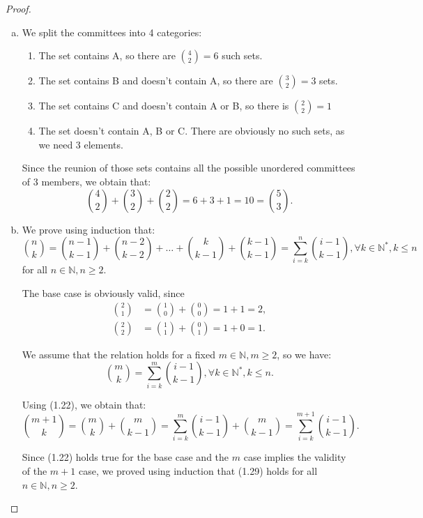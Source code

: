 \begin{proof}
    \hfill
    \begin{enumerate}[(a)]
        \item We split the committees into 4 categories:
            \begin{enumerate}[(1)]
                \item The set contains A, so there are $\binom{4}{2} = 6$ such sets.
                \item The set contains B and doesn't contain A, so there are $\binom{3}{2} = 3$ sets.
                \item The set contains C and doesn't contain A or B, so there is $\binom{2}{2} = 1$
                \item The set doesn't contain A, B or C. There are obviously no such sets, as we
                    need 3 elements.
           \end{enumerate}

        Since the reunion of those sets contains all the possible unordered committees of 3 members,
        we obtain that:
        \[
            \binom{4}{2} + \binom{3}{2} + \binom{2}{2} = 6 + 3 + 1 = 10 = \binom{5}{3}
        .\] 
        
    \item We prove using induction that:
    \begin{equation*}\tag{1.29}
        \binom{n}{k} = \binom{n - 1}{k - 1} + \binom{n - 2}{k - 2} + \ldots + 
                        \binom{k}{k - 1} + \binom{k - 1}{k - 1}
                        = \sum_{i = k}^{n} \binom{i - 1}{k - 1}, \forall k \in \mathbb{N^*}, k \leq n
    \end{equation*}
    for all $n \in \mathbb{N}, n \geq 2$.

    The base case is obviously valid, since
    \begin{align*}
        \binom{2}{1} &= \binom{1}{0} + \binom{0}{0} = 1 + 1 = 2, \\
        \binom{2}{2} &= \binom{1}{1} + \binom{0}{1} = 1 + 0 = 1
    .\end{align*}

    We assume that the relation holds for a fixed $m \in \mathbb{N}, m \geq 2$, so we have:
    \[
        \binom{m}{k} = \sum_{i = k}^{m}\binom{i - 1}{k - 1}, \forall k \in \mathbb{N^*}, k \leq n
    .\]

    Using (1.22), we obtain that: 
    \[
        \binom{m + 1}{k} = \binom{m}{k} + \binom{m}{k - 1} 
                         = \sum_{i = k}^{m}\binom{i - 1}{k - 1} + \binom{m}{k - 1} 
                         = \sum_{i = k}^{m + 1}\binom{i - 1}{k - 1} 
    .\] 

    Since (1.22) holds true for the base case and the $m$ case implies the validity of the $m + 1$ case,
    we proved using induction that (1.29) holds for all $n \in \mathbb{N}, n \geq 2$.
\end{enumerate}
\end{proof}
